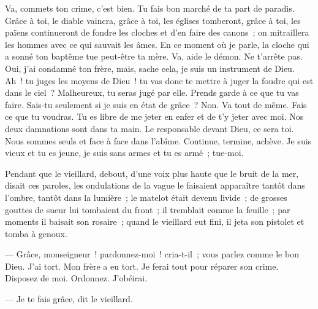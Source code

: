 \documentclass[french,twoside]{book} %
\begin{document}
Va, commets ton crime, c’est bien. Tu fais bon marché de ta part de paradis. Grâce à toi, le diable vaincra, grâce à toi, les églises tomberont, grâce à toi, les païens continueront de fondre les cloches et d’en faire des canons ; on mitraillera les  hommes avec ce qui sauvait les âmes. En ce moment où je parle, la cloche qui a sonné ton baptême tue peut-être ta mère. Va, aide le démon. Ne t’arrête pas. Oui, j’ai condamné ton frère, mais, sache cela, je suis un instrument de Dieu. Ah ! tu juges les moyens de Dieu ! tu vas donc te mettre à juger la foudre qui est dans le ciel ? Malheureux, tu seras jugé par elle. Prends garde à ce que tu vas faire. Sais-tu seulement si je suis en état de grâce ? Non. Va tout de même. Fais ce que tu voudras. Tu es libre de me jeter en enfer et de t’y jeter avec moi. Nos deux damnations sont dans ta main. Le responsable devant Dieu, ce sera toi. Nous sommes seuls et face à face dans l’abîme. Continue, termine, achève. Je suis vieux et tu es jeune, je suis sans armes et tu es armé ; tue-moi.\par
Pendant que le vieillard, debout, d’une voix plus haute que le bruit de la mer, disait ces paroles, les ondulations de la vague le faisaient apparaître tantôt dans l’ombre, tantôt dans la lumière ; le matelot était devenu livide ; de grosses gouttes de sueur lui tombaient du front ; il tremblait comme la feuille ; par moments il baisait son rosaire ; quand le vieillard eut fini, il jeta son pistolet et tomba à genoux.\par
— Grâce, monseigneur ! pardonnez-moi ! cria-t-il ; vous parlez comme le bon Dieu. J’ai tort. Mon frère a eu tort. Je ferai tout pour réparer son crime. Disposez de moi. Ordonnez. J’obéirai.\par
— Je te fais grâce, dit le vieillard.
\end{document}
